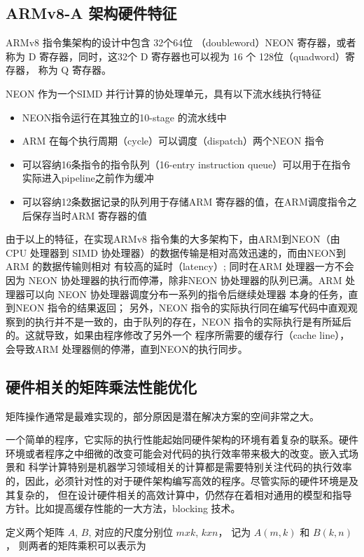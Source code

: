 \subsection{ARMv8-A 架构硬件特征}

ARMv8 指令集架构的设计中包含 32个64位 （doubleword）NEON 寄存器，或者称为 D 寄存器，同时，这32个 D 寄存器也可以视为 16 个 128位（quadword）寄存器，
称为 Q 寄存器。

NEON 作为一个SIMD 并行计算的协处理单元，具有以下流水线执行特征
\begin{itemize}
\item NEON指令运行在其独立的10-stage 的流水线中
\item ARM 在每个执行周期（cycle）可以调度（dispatch）两个NEON 指令
\item 可以容纳16条指令的指令队列（16-entry instruction queue）可以用于在指令实际进入pipeline之前作为缓冲
\item 可以容纳12条数据记录的队列用于存储ARM 寄存器的值，在ARM调度指令之后保存当时ARM 寄存器的值
\end{itemize}

由于以上的特征，在实现ARMv8 指令集的大多架构下，由ARM到NEON（由CPU 处理器到 SIMD 协处理器）的数据传输是相对高效迅速的，而由NEON到ARM 的数据传输则相对
有较高的延时（latency）;
同时在ARM 处理器一方不会因为 NEON 协处理器的执行而停滞，除非NEON 协处理器的队列已满。ARM 处理器可以向 NEON 协处理器调度分布一系列的指令后继续处理器
本身的任务，直到NEON 指令的结果返回；
另外，NEON 指令的实际执行同在编写代码中直观观察到的执行并不是一致的，由于队列的存在，NEON 指令的实际执行是有所延后的。这就导致，如果由程序修改了另外一个
程序所需要的缓存行（cache line），会导致ARM 处理器侧的停滞，直到NEON的执行同步。

\subsection{硬件相关的矩阵乘法性能优化}
矩阵操作通常是最难实现的，部分原因是潜在解决方案的空间非常之大。 

一个简单的程序，它实际的执行性能起始同硬件架构的环境有着复杂的联系。硬件环境或者程序之中细微的改变可能会对代码的执行效率带来极大的改变。嵌入式场景和
科学计算特别是机器学习领域相关的计算都是需要特别关注代码的执行效率的，因此，必须针对性的对于硬件架构编写高效的程序。尽管实际的硬件环境是及其复杂的，
但在设计硬件相关的高效计算中，仍然存在着相对通用的模型和指导方针。比如提高缓存性能的一大方法，blocking 技术。

定义两个矩阵 $A$, $B$, 对应的尺度分别位 $m x k$, $k x n$， 记为 $A(m, k) $ 和 $ B(k, n) $， 则两者的矩阵乘积可以表示为

